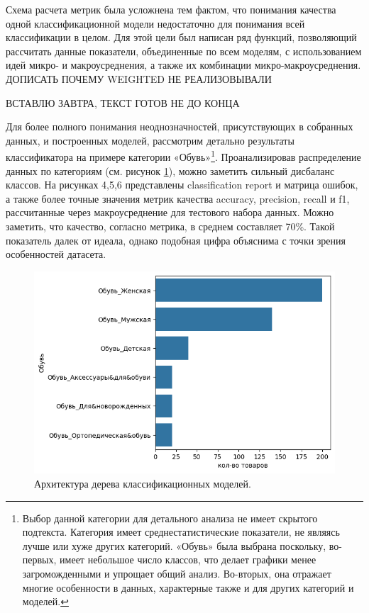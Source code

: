 \documentclass[a4paper,12pt]{extarticle}
\begin{document}
Схема расчета метрик была усложнена тем фактом, что понимания качества одной классификационной модели недостаточно для понимания всей классификации в целом. Для этой цели был написан ряд функций, позволяющий рассчитать данные показатели, объединенные по всем моделям, с использованием идей микро- и макроусреднения, а также их комбинации микро-макроусреднения. ДОПИСАТЬ ПОЧЕМУ WEIGHTED НЕ РЕАЛИЗОВЫВАЛИ

ВСТАВЛЮ ЗАВТРА, ТЕКСТ ГОТОВ НЕ ДО КОНЦА

Для более полного понимания неоднозначностей, присутствующих в собранных данных, и построенных моделей, рассмотрим детально результаты классификатора на примере категории «Обувь»\footnote{Выбор данной категории для детального анализа не имеет скрытого подтекста. Категория имеет среднестатистические показатели, не являясь лучше или хуже других категорий. «Обувь» была выбрана поскольку, во-первых, имеет небольшое число классов, что делает графики менее загроможденными и упрощает общий анализ. Во-вторых, она отражает многие особенности в данных, характерные также и для других категорий и моделей.}. Проанализировав распределение данных по категориям (см. рисунок \ref{fig:amount_of_category_Обувь2}), можно заметить сильный дисбаланс классов. На рисунках 4,5,6 представлены classification report и матрица ошибок, а также более точные значения метрик качества accuracy, precision, recall и f1, рассчитанные через макроусреднение для тестового набора данных. Можно заметить, что качество, согласно метрика, в среднем составляет 70\%. Такой показатель далек от идеала, однако подобная цифра объяснима с точки зрения особенностей датасета. 

\begin{figure}[ht]
	\centering
	\includegraphics[scale=0.6]{приложения/amount_of_category_Обувь.png}
	\caption{Архитектура дерева классификационных моделей.}
	\label{fig:amount_of_category_Обувь2}
\end{figure}
\end{document}
